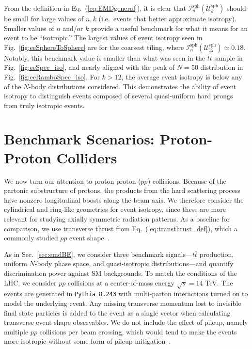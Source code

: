 \documentclass[letterpaper,11pt]{article}
\newcommand{\iso}[2]{\mathcal{I}^\text{#1}_{#2}}
\DeclareRobustCommand{\Sec}[1]{Sec.~\ref{#1}}
\DeclareRobustCommand{\Fig}[1]{Fig.~\ref{#1}}
\DeclareRobustCommand{\Eq}[1]{Eq.~(\ref{#1})}
\begin{document}
From the definition in \Eq{eq:EMDgeneral}, it is clear that $\iso{sph}{n}(\mathcal{U}^\text{sph}_{k})$ should be small for large values of $n, k$ (i.e.\ events that better approximate isotropy). 
%
Smaller values of $n$ and/or $k$ provide a useful benchmark for what it means for an event to be ``isotropic.''
%
The largest values of event isotropy seen in \Fig{fig:eeSphereToSphere} are for the coarsest tiling, where $\iso{sph}{n}(\mathcal{U}^\text{sph}_{12}) \simeq 0.18$. 
%
Notably, this benchmark value is smaller than what was seen in the $t\bar{t}$ sample in \Fig{fig:eeSpec_iso}, and nearly aligned with the peak of $N=50$ distribution in \Fig{fig:eeRamboSpec_iso}. 
%
For $k>12$, the average event isotropy is below any of the $N$-body distributions considered. 
%
This demonstrates the ability of event isotropy to distinguish events composed of several quasi-uniform hard prongs from truly isotropic events. 



\section{Benchmark Scenarios: Proton-Proton Colliders}
\label{sec:ppBE}


We now turn our attention to proton-proton ($pp$) collisions.
%
Because of the partonic substructure of protons, the products from the hard scattering process have nonzero longitudinal boosts along the beam axis. 
%
We therefore consider the cylindrical and ring-like geometries for event isotropy, since these are more relevant for studying axially symmetric radiation patterns.
%
As a baseline for comparison, we use transverse thrust from \Eq{eq:transthrust_def}, which a commonly studied $pp$ event shape~\cite{Bertram:2002sv,Nagy:2003tz,Banfi:2004nk,Banfi:2010xy}.


As in \Sec{sec:emdBE}, we consider three benchmark signals---$t\bar{t}$ production, uniform $N$-body phase space, and quasi-isotropic distributions---and quantify discrimination power against SM backgrounds.
%
To match the conditions of the LHC, we consider $pp$ collisions at a center-of-mass energy $\sqrt{s} = 14$ TeV. 
%
The events are generated in \texttt{Pythia 8.243} with multi-parton interactions turned on to model the underlying event.
%
Any missing transverse momentum lost to invisible final state particles is added to the event as a single vector when calculating transverse event shape observables. 
%
We do not include the effect of pileup, namely multiple $pp$ collisions per beam crossing, which would tend to make the events more isotropic without some form of pileup mitigation~\cite{Soyez:2018opl}.
\end{document}
